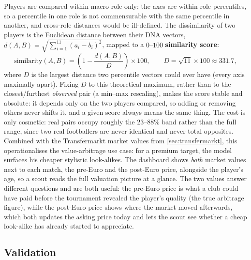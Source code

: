 \documentclass[12pt,a4paper]{article}
\begin{document}
Players are compared within macro-role only: the axes are within-role percentiles, so a percentile in one role is not commensurable with the same percentile in another, and cross-role distances would be ill-defined.
The dissimilarity of two players is the Euclidean distance between their DNA vectors, $d(A,B) = \sqrt{\sum_{i=1}^{11}(a_i - b_i)^2}$, mapped to a $0$--$100$ \textbf{similarity score}:
\begin{equation}\label{eq:h4-similarity}
    \text{similarity}(A,B) = \left(1 - \frac{d(A,B)}{D}\right) \times 100, \qquad D = \sqrt{11} \times 100 \approx 331.7,
\end{equation}
where $D$ is the largest distance two percentile vectors could ever have (every axis maximally apart).
Fixing $D$ to this theoretical maximum, rather than to the closest/furthest \emph{observed} pair (a min--max rescaling), makes the score stable and absolute: it depends only on the two players compared, so adding or removing others never shifts it, and a given score always means the same thing.
The cost is only cosmetic: real pairs occupy roughly the $23$--$88\%$ band rather than the full range, since two real footballers are never identical and never total opposites.
Combined with the Transfermarkt market values from \cref{sec:transfermarkt}, this operationalises the value-arbitrage use case: for a premium target, the model surfaces his cheaper stylistic look-alikes. The dashboard shows \emph{both} market values next to each match, the pre-Euro and the post-Euro price, alongside the player's age, so a scout reads the full valuation picture at a glance. The two values answer different questions and are both useful: the pre-Euro price is what a club could have paid before the tournament revealed the player's quality (the true arbitrage figure), while the post-Euro price shows where the market moved afterwards, which both updates the asking price today and lets the scout see whether a cheap look-alike has already started to appreciate.

\subsection{Validation}\label{sec:h4-validation}
\end{document}
